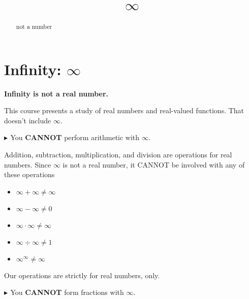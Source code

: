 \documentclass{ximera}
\title{$\infty$}
\begin{document}
\begin{abstract}
not a number
\end{abstract}
\maketitle




\section{Infinity: $\infty$}


\begin{center}
\textbf{\textcolor{red!80!black}{Infinity is not a real number.}}
\end{center}




This course presents a study of real numbers and real-valued functions. That doesn't include $\infty$.




\textbf{\textcolor{red!90!darkgray}{$\blacktriangleright$ }} You \textbf{\textcolor{red!80!black}{CANNOT}} perform arithmetic with $\infty$.

Addition, subtraction, multiplication, and division are operations for real numbers.  Since $\infty$ is not a real number, it CANNOT be involved with any of these operations


\begin{example}


\begin{itemize}
\item $\infty + \infty \ne \infty$
\item $\infty - \infty \ne 0$
\item $\infty \cdot \infty \ne \infty$
\item $\infty \div \infty \ne 1$
\item $\infty^{\infty} \ne \infty$
\end{itemize}


\end{example}

Our operations are strictly for real numbers, only.









\textbf{\textcolor{red!90!darkgray}{$\blacktriangleright$ }} You \textbf{\textcolor{red!80!black}{CANNOT}} form fractions with $\infty$.
\end{document}
